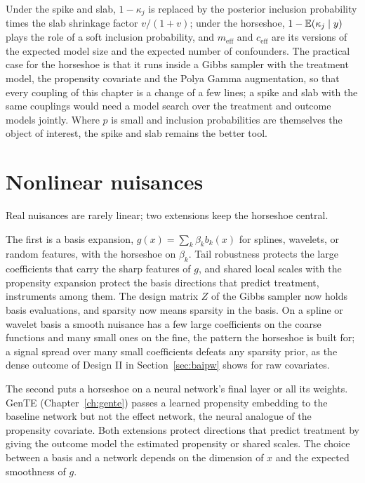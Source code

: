Under the spike and slab, $1 - \kappa_j$ is replaced by the posterior inclusion probability times the slab shrinkage factor $v/(1 + v)$; under the horseshoe, $1 - \mathbb{E}(\kappa_j \mid y)$ plays the role of a soft inclusion probability, and $m_{\mathrm{eff}}$ and $c_{\mathrm{eff}}$ are its versions of the expected model size and the expected number of confounders. The practical case for the horseshoe is that it runs inside a Gibbs sampler with the treatment model, the propensity covariate and the Polya Gamma augmentation, so that every coupling of this chapter is a change of a few lines; a spike and slab with the same couplings would need a model search over the treatment and outcome models jointly. Where $p$ is small and inclusion probabilities are themselves the object of interest, the spike and slab remains the better tool.

\section{Nonlinear nuisances}

Real nuisances are rarely linear; two extensions keep the horseshoe central.

The first is a basis expansion, $g(x) = \sum_k \beta_k b_k(x)$ for splines, wavelets, or random features, with the horseshoe on $\beta_k$. Tail robustness protects the large coefficients that carry the sharp features of $g$, and shared local scales with the propensity expansion protect the basis directions that predict treatment, instruments among them. The design matrix $Z$ of the Gibbs sampler now holds basis evaluations, and sparsity now means sparsity in the basis. On a spline or wavelet basis a smooth nuisance has a few large coefficients on the coarse functions and many small ones on the fine, the pattern the horseshoe is built for; a signal spread over many small coefficients defeats any sparsity prior, as the dense outcome of Design II in Section~\ref{sec:baipw} shows for raw covariates.

The second puts a horseshoe on a neural network's final layer or all its weights. GenTE (Chapter~\ref{ch:gente}) passes a learned propensity embedding to the baseline network but not the effect network, the neural analogue of the propensity covariate. Both extensions protect directions that predict treatment by giving the outcome model the estimated propensity or shared scales. The choice between a basis and a network depends on the dimension of $x$ and the expected smoothness of $g$.

